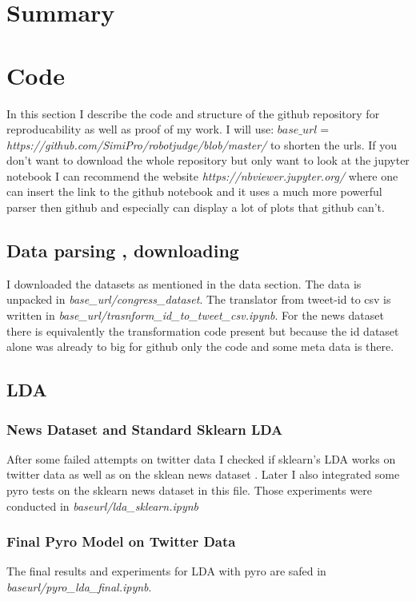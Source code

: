 \documentclass[10pt,conference,compsocconf]{IEEEtran}
\begin{document}
\section{Summary}
\label{sec:Summary}

\section{Code}
\label{sec:Code}
In this section I describe the code and structure of the github repository for reproducability as well as proof of my work. I will use: $base\_url =$ \textit{https://github.com/SimiPro/robotjudge/blob/master/} to shorten the urls. If you don't want to download the whole repository but only want to look at the jupyter notebook I can recommend the website \textit{https://nbviewer.jupyter.org/} where one can insert the link to the github notebook and it uses a much more powerful parser then github and especially can display a lot of plots that github can't.

\subsection{Data parsing , downloading}
I downloaded the datasets as mentioned in the data section. The data is unpacked in \textit{base\_url/congress\_dataset}. The translator from tweet-id to csv is written in \textit{base\_url/trasnform\_id\_to\_tweet\_csv.ipynb}. For the news dataset there is equivalently the transformation code present but because the id dataset alone was already to big for github only the code and some meta data is there. 

\subsection{LDA}
\subsubsection{News Dataset and Standard Sklearn LDA}
After some failed attempts on twitter data I checked if sklearn's LDA works on twitter data as well as on the sklean news dataset \cite{sklearn_newsdataset}. Later I also integrated some pyro tests on the sklearn news dataset in this file. Those experiments were conducted in \textit{baseurl/lda\_sklearn.ipynb}
\subsubsection{Final Pyro Model on Twitter Data}
The final results and experiments for LDA with pyro are safed in \textit{baseurl/pyro\_lda\_final.ipynb}.
\end{document}
